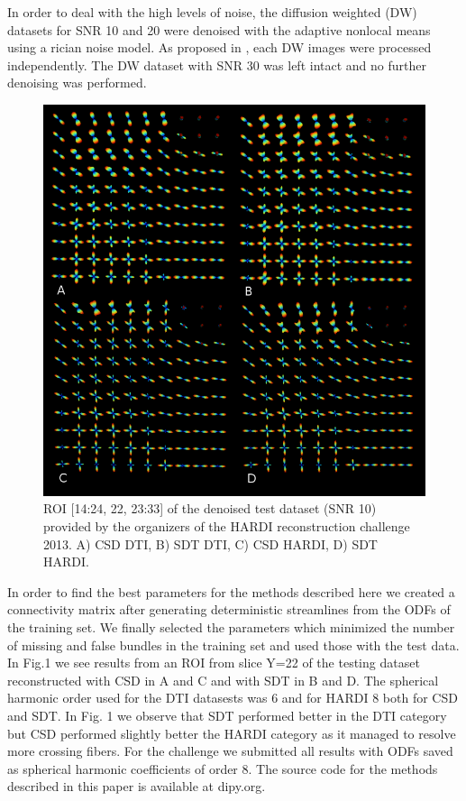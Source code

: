 \documentclass[9pt,conference,a4paper]{IEEEtran}
\begin{document}
In order to deal with the high levels of noise, the diffusion weighted (DW) datasets for SNR 10 and 20 were denoised with the adaptive nonlocal means \cite{manjon-coupe:10} using a rician noise model. As proposed in \cite{descoteaux-wiest-daessle-etal:08}, each DW images were processed independently. The DW dataset with SNR 30 was left intact and no further denoising was performed. 

\begin{figure}[h]
\begin{centering}
\includegraphics[scale=1.2]{csd_sdt_snr10}
\end{centering}
\caption{ROI [14:24, 22, 23:33] of the denoised test dataset (SNR 10) provided by the organizers of the HARDI reconstruction challenge 2013. A) CSD DTI, B) SDT DTI, 
C) CSD HARDI, D) SDT HARDI.}
\end{figure}

 In order to find the best parameters for the methods described here we created a connectivity matrix after generating deterministic streamlines from the ODFs of the training set. We finally selected the parameters which minimized the number of missing and false bundles in the training set and used those with the test data.
 In Fig.1 we see results from an ROI from slice Y=22 of the testing dataset reconstructed with CSD in A and C and with SDT in B and D. The spherical harmonic order used for the DTI datasests was 6 and for HARDI 8 both for CSD and SDT. In Fig. 1 we observe that SDT performed better in the DTI category but CSD performed slightly better the HARDI category as it managed to resolve more crossing fibers. For the challenge we submitted all results with ODFs saved as spherical harmonic coefficients of order 8. The source code for the methods described in this paper is available at dipy.org.



\end{document}
